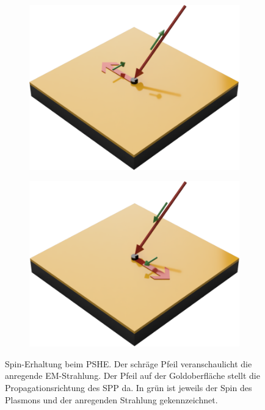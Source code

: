 \documentclass[titlepage,  ngerman]{article}
\begin{document}
	\begin{figure}[h]
		\begin{subfigure}[h]{0.49\textwidth}
			\centering
			\includegraphics[width=\textwidth]{figures/pshe_left.png}
			\caption{}
			\label{fig:pshe_left}
		\end{subfigure}		
		\begin{subfigure}[h]{0.5\textwidth}
			\centering
			\includegraphics[width=\textwidth]{figures/pshe_right.png}
			\caption{}
			\label{fig:pshe_right}
		\end{subfigure}	
		\caption[Spin-Erhaltung beim PSHE]{Spin-Erhaltung beim PSHE. Der schräge Pfeil veranschaulicht die anregende EM-Strahlung. Der Pfeil auf der Goldoberfläche stellt die Propagationsrichtung des SPP da. In grün ist jeweils der Spin des Plasmons und der anregenden Strahlung gekennzeichnet.}
		\label{fig:spin_hall_schema}
	\end{figure}
	
\end{document}
